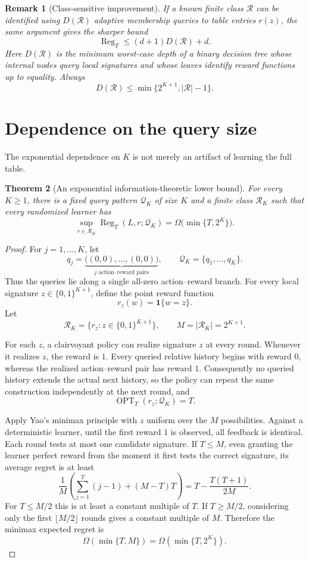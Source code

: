 \documentclass[11pt]{article}
\newtheorem{theorem}{Theorem}[section]
\newtheorem{remark}[theorem]{Remark}
\newcommand{\QQ}{\mathcal Q}
\newcommand{\RR}{\mathcal R}
\newcommand{\OPT}{\operatorname{OPT}}
\newcommand{\Reg}{\operatorname{Reg}}
\begin{document}
\begin{remark}[Class-sensitive improvement]
If a known finite class $\RR$ can be identified using $D(\RR)$ adaptive membership queries to table entries $r(z)$, the same argument gives the sharper bound
\[
    \Reg_T
    \leq
    (d+1)D(\RR)+d.
\]
Here $D(\RR)$ is the minimum worst-case depth of a binary decision tree whose internal nodes query local signatures and whose leaves identify reward functions up to equality.  Always
\[
    D(\RR)\leq \min\{2^{K+1},|\RR|-1\}.
\]
\end{remark}

\section{Dependence on the query size}

The exponential dependence on $K$ is not merely an artifact of learning the full table.

\begin{theorem}[An exponential information-theoretic lower bound]\label{thm:info-lower}
For every $K\geq 1$, there is a fixed query pattern $\QQ_K$ of size $K$ and a finite class $\RR_K$ such that every randomized learner has
\[
    \sup_{r\in\RR_K}
    \Reg_T(L,r;\QQ_K)
    =\Omega\bigl(\min\{T,2^K\}\bigr).
\]
\end{theorem}

\begin{proof}
For $j=1,\ldots,K$, let
\[
    q_j
    =\underbrace{\bigl((0,0),\ldots,(0,0)\bigr)}_{j\text{ action--reward pairs}},
    \qquad
    \QQ_K=\{q_1,\ldots,q_K\}.
\]
Thus the queries lie along a single all-zero action--reward branch.
For every local signature $z\in\{0,1\}^{K+1}$, define the point reward function
\[
    r_z(w)=\mathbf 1\{w=z\}.
\]
Let
\[
    \RR_K=\{r_z:z\in\{0,1\}^{K+1}\},
    \qquad
    M=|\RR_K|=2^{K+1}.
\]

For each $z$, a clairvoyant policy can realize signature $z$ at every round.  Whenever it realizes $z$, the reward is $1$.  Every queried relative history begins with reward $0$, whereas the realized action--reward pair has reward $1$.  Consequently no queried history extends the actual next history, so the policy can repeat the same construction independently at the next round, and
\[
    \OPT_T(r_z;\QQ_K)=T.
\]

Apply Yao's minimax principle with $z$ uniform over the $M$ possibilities.  Against a deterministic learner, until the first reward $1$ is observed, all feedback is identical.  Each round tests at most one candidate signature.  If $T\leq M$, even granting the learner perfect reward from the moment it first tests the correct signature, its average regret is at least
\[
    \frac{1}{M}
    \left(
        \sum_{j=1}^{T}(j-1)+(M-T)T
    \right)
    =T-\frac{T(T+1)}{2M}.
\]
For $T\leq M/2$ this is at least a constant multiple of $T$.  If $T\geq M/2$, considering only the first $\lfloor M/2\rfloor$ rounds gives a constant multiple of $M$.  Therefore the minimax expected regret is
\[
    \Omega(\min\{T,M\})
    =\Omega(\min\{T,2^K\}).
\]
\end{proof}
\end{document}
